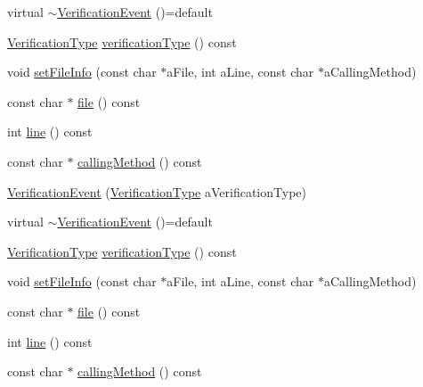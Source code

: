 \begin{DoxyCompactItemize}
\item 
virtual \mbox{\hyperlink{structfakeit_1_1VerificationEvent_a5bcca5502a6be4d65db30c1927652a77}{$\sim$\+Verification\+Event}} ()=default
\item 
\mbox{\hyperlink{namespacefakeit_a9df22520dd60badb149c1d1d2518b253}{Verification\+Type}} \mbox{\hyperlink{structfakeit_1_1VerificationEvent_a8b06372b0691ff1f6f2c4f59f5b05922}{verification\+Type}} () const
\item 
void \mbox{\hyperlink{structfakeit_1_1VerificationEvent_a6199b34d65e06976395f606f0c92f361}{set\+File\+Info}} (const char $\ast$a\+File, int a\+Line, const char $\ast$a\+Calling\+Method)
\item 
const char $\ast$ \mbox{\hyperlink{structfakeit_1_1VerificationEvent_ac5e560840147ea9e20e7e802470f4d8a}{file}} () const
\item 
int \mbox{\hyperlink{structfakeit_1_1VerificationEvent_a3069b93e69102a34fca21178e931e789}{line}} () const
\item 
const char $\ast$ \mbox{\hyperlink{structfakeit_1_1VerificationEvent_a13a854b648de4ed0a11d9f1bd3d22da5}{calling\+Method}} () const
\item 
\mbox{\hyperlink{structfakeit_1_1VerificationEvent_afc2366f1ae4d03ec60cc2a2253a79728}{Verification\+Event}} (\mbox{\hyperlink{namespacefakeit_a9df22520dd60badb149c1d1d2518b253}{Verification\+Type}} a\+Verification\+Type)
\item 
virtual \mbox{\hyperlink{structfakeit_1_1VerificationEvent_a5bcca5502a6be4d65db30c1927652a77}{$\sim$\+Verification\+Event}} ()=default
\item 
\mbox{\hyperlink{namespacefakeit_a9df22520dd60badb149c1d1d2518b253}{Verification\+Type}} \mbox{\hyperlink{structfakeit_1_1VerificationEvent_a8b06372b0691ff1f6f2c4f59f5b05922}{verification\+Type}} () const
\item 
void \mbox{\hyperlink{structfakeit_1_1VerificationEvent_a6199b34d65e06976395f606f0c92f361}{set\+File\+Info}} (const char $\ast$a\+File, int a\+Line, const char $\ast$a\+Calling\+Method)
\item 
const char $\ast$ \mbox{\hyperlink{structfakeit_1_1VerificationEvent_ac5e560840147ea9e20e7e802470f4d8a}{file}} () const
\item 
int \mbox{\hyperlink{structfakeit_1_1VerificationEvent_a3069b93e69102a34fca21178e931e789}{line}} () const
\item 
const char $\ast$ \mbox{\hyperlink{structfakeit_1_1VerificationEvent_a13a854b648de4ed0a11d9f1bd3d22da5}{calling\+Method}} () const
\end{DoxyCompactItemize}


